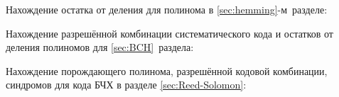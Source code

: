\newpage
{} 
\label{sec:octave}

Нахождение остатка от деления для полинома в
\ref{sec:hemming}-м~разделе:  



Нахождение разрешённой комбинации систематического кода и остатков от
деления полиномов для \ref{sec:BCH}~раздела:

 

Нахождение порождающего полинома, разрешённой кодовой комбинации,
синдромов для кода БЧХ в разделе \ref{sec:Reed-Solomon}:
\label{page}

 \newpage



